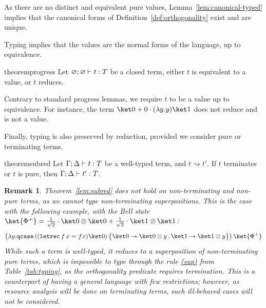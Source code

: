 \documentclass[10pt,a4paper]{article}
\newcommand{\textqcase}{\ensuremath{\mathtt{qcase}}}
\newcommand{\textletrec}{\ensuremath{\mathtt{letrec}}}
\newcommand{\zket}{\ket 0}
\newcommand{\oket}{\ket 1}
\newcommand{\qcasebase}[2]{
  \textqcase\,#1\left\{\! \begin{aligned} #2 \end{aligned}\right\}
}
\newcommand{\qcase}[3]{
  \qcasebase {#1} {\zket \to #2\,, \oket \to #3}
}
\newcommand{\lbd}[2]{\lambda #1 .#2}
\newcommand{\letrec}[3]{\textletrec\,#1\,#2=#3}
\newcommand{\typing}[4]{
  \ifx&#1&\varnothing \else #1\fi; 
  \ifx&#2&\varnothing \else #2\fi 
  \vdash {#3} : #4
}
\newcommand{\closedtyping}[2]{\typing{}{}{#1}{#2}}
\newcommand{\reduces}{\rightsquigarrow}
\newtheorem{remark}[theorem]{Remark}
\begin{document}
As there are no distinct and equivalent pure values,
Lemma~\ref{lem:canonical-typed} implies that the canonical forms of
Definition~\ref{def:orthogonality} exist and are unique.

Typing implies that the values are the normal forms
of the language, up to equivalence.

\begin{restatable}[Progress]{theorem}{progress}
  \label{lem:progress}
  Let $\closedtyping t T$ be a closed term, either $t$ is equivalent
  to a value, or $t$ reduces.
\end{restatable}

Contrary to standard progress lemmas, we require $t$ to be a value up to
equivalence. For instance, the term $\zket + 0 \cdot (\lbd y y) \oket$ does not 
reduce and is not a value.

Finally, typing is also preserved by reduction, provided we consider pure or
terminating terms.

\begin{restatable}{theorem}{subred}
  \label{lem:subred}
  Let $\typing \Gamma \Delta t T$ be a well-typed term, and $t \reduces t'$.
  If $t$ terminates or $t$ is pure,
  then $\typing \Gamma \Delta {t'} T$.
\end{restatable}

\begin{remark}\label{rem:subred}
  Theorem~\ref{lem:subred} does not hold on non-terminating and non-pure
  terms, as we cannot type non-terminating superpositions.
  This is the case with the following example, with the Bell state
  $\ket{\Phi^+} =
  \frac{1}{\sqrt 2} \cdot \zket\otimes \zket
  + \frac{1}{\sqrt 2} \cdot \oket\otimes \oket$:
  \[
    \left(\lbd y \qcase{
        ((\letrec f x fx)\zket)
    }{\zket \otimes y}{\oket \otimes y}\right) \ket{\Phi^+}
  \]
  While such a term is well-typed, it reduces to a superposition of
  non-terminating pure terms, which is impossible to type through the rule
  \hyperlink{typesup}{(sup)} from Table~\ref{tab:typing}, as
  the orthogonality predicate requires termination. This is a counterpart of
  having a general language with few restrictions; however, as resource
  analysis will be done on terminating terms, such ill-behaved cases will not be
  considered.
\end{remark}
\end{document}
